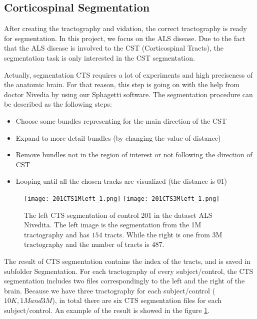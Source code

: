 \subsection{Corticospinal Segmentation}
\label{subsec:experiments_segmentation}
After creating the tractography and vidation, the correct tractography is ready for segmentation. In this project, we focus on the ALS disease. Due to the fact that the ALS disease is involved to the CST (Corticospinal Tracts), the segmentation task is only interested in the CST segmentation. 

Actually, segmentation CTS requires a lot of experiments and high preciseness of the anatomic brain. For that reason, this step is going on with the help from doctor Nivedia by using our Sphagetti software. The segmentation procedure can be described as the following steps:
\begin{itemize}
	\item Choose some bundles representing for the main direction of the CST
	\item Expand to more detail bundles (by changing the value of distance)
	\item Remove bundles not in the region of interest or not following the direction of CST
	\item Looping until all the chosen tracks are visualized (the distance is 01)
\end{itemize}

\begin{figure}
  \centering
  \texttt{[image: 201CTS1Mleft\_1.png]}
  \texttt{[image: 201CTS3Mleft\_1.png]}%
  \caption{The left CTS segmentation of control 201 in the dataset ALS\underline{ }Nivedita. The left image is the segmentation from the 1M tractography and has $154$ tracts. While the right is one from 3M tractography and the number of tracts is $487$.}
  \label{fig:CTS_201_left}
\end{figure}

The result of CTS segmentation contains the index of the tracts, and is saved in subfolder Segmentation. For each tractography of every subject/control, the CTS segmentation includes two files correspondingly to the left and the right of the brain. Because we have three tractography for each subject/control ($10K, 1M and 3M$), in total there are six CTS segmentation files for each subject/control. An example of the result is showed in the figure \ref{fig:CTS_201_left}.


